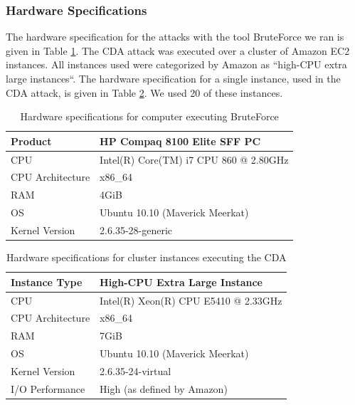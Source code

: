 \documentclass[pdftex,english,10pt,b5paper,twoside]{book}
\begin{document}
\subsubsection{Hardware Specifications} The hardware specification for the
attacks with the tool BruteForce we ran is given in Table \ref{tab:hwbf}. The
\ac{CDA} attack was executed over a cluster of Amazon \ac{EC2} instances. All
instances used were categorized by Amazon as ``high-CPU extra large
instances``. The hardware specification for a single instance, used in the
\ac{CDA} attack, is given in Table \ref{tab:hwcda}. We used 20 of these
instances.

\begin{table}[!h]
    \centering
    \caption{Hardware specifications for computer executing BruteForce}
    \label{tab:hwbf}
    \begin{tabular}{| l | l |}
	\hline
	Product		        &HP Compaq 8100 Elite SFF PC \\
	\hline
	CPU		            &Intel(R) Core(TM) i7 CPU 860 @ 2.80GHz\\
	\hline
	CPU Architecture    &x86\_64\\
	\hline
	RAM		            &4GiB\\
	\hline
	OS		            &Ubuntu 10.10 (Maverick Meerkat)\\
	\hline
	Kernel Version	    &2.6.35-28-generic\\
	\hline
    \end{tabular}
\end{table}

\begin{table}[!h]
    \centering
    \caption{Hardware specifications for cluster instances executing the
    \ac{CDA}}
    \label{tab:hwcda}
    \begin{tabular}{| l | l |}
	\hline
	Instance Type       &High-CPU Extra Large Instance\\
	\hline
	CPU		            &Intel(R) Xeon(R) CPU E5410 @ 2.33GHz\\
	\hline
	CPU Architecture    &x86\_64\\
	\hline
	RAM		            &7GiB\\
	\hline
	OS		            &Ubuntu 10.10 (Maverick Meerkat)\\
	\hline
	Kernel Version	    &2.6.35-24-virtual\\
	\hline
	I/O Performance	    &High (as defined by Amazon)\\
	\hline
    \end{tabular}
\end{table}
\end{document}
